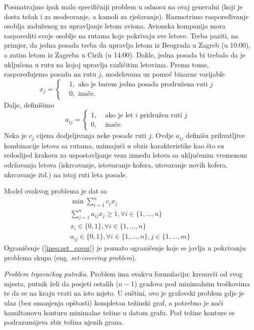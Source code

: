 \documentclass[a4paper, utf8, 11pt, colorlinks]{book}
\begin{document}
Posmatrajmo ipak malo specifičniji problem u odnosu na ovaj generalni (koji je dosta težak i za modeovanje, a kamoli za rješavanje). 
Razmotrimo raspoređivanje osoblja zaduženog za upravljanje letom aviona. 
Avionska kompanija mora rasporediti svoje osoblje na rutama koje pokrivaju sve letove. Treba paziti, na primjer, da jedna posada treba da upravlja letom iz  Beograda u Zagreb (u 10:00), a zatim letom iz Zagreba u Cirih (u 14:00). Dakle, jedna posada bi trebalo da je uključena u rutu na kojoj upravlja različitim letovima. Prema tome, raspoređujemo posadu na rutu $j$, modelovana uz pomoć binarne varijable 
$$x_j = \begin{cases}
    &1, \mbox{ ako je barem jedna posada prodružena ruti } j \\
    &0, \mbox{ inače}. 
\end{cases}
$$
Dalje, definišimo 
$$a_{ij}= \begin{cases}
             1,& \mbox{ ako je let } i \mbox{ pridružen ruti } j \\
             0,& \mbox{ inače}.
        \end{cases}
$$
Neka je $c_j$ cijena dodjeljivanja neke posade ruti $j$. Ovdje $a_{ij}$ definišu prihvatljive kombinacije letova sa rutama, uzimajući u obzir  karakteristike kao što su redoslijed krakova za uspostavljanje veza između letova sa uključenim vremenom  održavanja letova (iskrcavanje, istovaranje kofera, utovaranje novih kofera, ukrcavanje itd.) na istoj ruti leta posade.   

Model ovakvog problema je dat sa 
\begin{align}
    &\min \sum_{i=1}^n c_j x_j \nonumber\\
    & \sum_{j=1}^n a_{ij} x_j \geq 1, \forall i \in \{1,\ldots, n\} \label{ineq:set_cover} \\
    & x_i \in \{0, 1 \}, \forall i \in \{1, \ldots, n\} \\
    & a_{ij} \in \{0, 1\}, \forall i \in \{1, \ldots, n\}, j \in\{1,\ldots, m\} \nonumber
\end{align}
Ograničenje (\ref{ineq:set_cover}) je poznato ograničenje koje se javlja u pokrivanju problema skupa (eng. \emph{set-covering problem}).

\emph{Problem trgovačkog putnika}. Problem ima ovakvu formulaciju: krenuvši od svog mjesta, putnik želi da posjeti ostalih ($n-1$) gradova pod minimalnim troškovima te da se na kraju vrati na isto mjeto. U suštini, ovo je grafovski problem gdje je ulaz (bez smanjenja opštosti) kompletan težinski graf, a potrebno je naći hamiltonovu konturu minimalne težine u datom grafu. Pod težine konture se podrazumijeva zbir težina njenih grana. 
\end{document}
